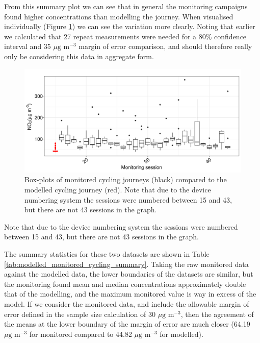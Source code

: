 From this summary plot we can see that in general the monitoring campaigns found higher concentrations than modelling the journey. When visualised individually (Figure \ref{fig:journey_boxplots}) we can see the variation more clearly. Noting that earlier we calculated that 27 repeat measurements were needed for a 80\% confidence interval and 35 $\mu \text{g m}^{-3}$ margin of error comparison, and should therefore really only be considering this data in aggregate form.

\begin{figure}[H]
\centering
\includegraphics[scale=0.5]{images/journey_boxplots.png}
\caption{Box-plots of monitored cycling journeys (black) compared to the modelled cycling journey (red). Note that due to the device numbering system the sessions were numbered between 15 and 43, but there are not 43 sessions in the graph.}
\label{fig:journey_boxplots}
\end{figure}

Note that due to the device numbering system the sessions were numbered between 15 and 43, but there are not 43 sessions in the graph.

The summary statistics for these two datasets are shown in Table \ref{tab:modelled_monitored_cycling_summary}. Taking the raw monitored data against the modelled data, the lower boundaries of the datasets are similar, but the monitoring found mean and median concentrations approximately double that of the modelling, and the maximum monitored value is way in excess of the model. If we consider the monitored data, and include the allowable margin of error defined in the sample size calculation of 30 $\mu \text{g m}^{-3}$, then the agreement of the means at the lower boundary of the margin of error are much closer (64.19 $\mu \text{g m}^{-3}$ for monitored compared to 44.82 $\mu \text{g m}^{-3}$ for modelled). 

